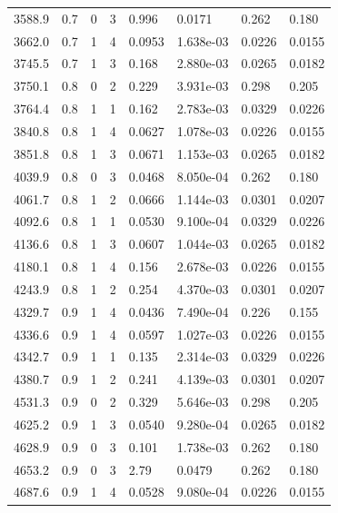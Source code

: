 \documentclass[preview]{standalone}
\begin{document}
{{{\begin{tabular}{L{1.2cm}C{1.2cm} C{0.3cm}C{0.5cm} C{1.4cm}C{1.4cm} C{1.4cm}C{1.4cm}}
  3588.9  &   0.7  & 0     &  3 &  0.996  & 0.0171  & 0.262 &  0.180   \\ 
  3662.0  &   0.7  & 1     &  4 &  0.0953  & 1.638e-03  & 0.0226 &  0.0155   \\ 
  3745.5  &   0.7  & 1     &  3 &  0.168  & 2.880e-03  & 0.0265 &  0.0182   \\ 
  3750.1  &   0.8  & 0     &  2 &  0.229  & 3.931e-03  & 0.298 &  0.205   \\ 
  3764.4  &   0.8  & 1     &  1 &  0.162  & 2.783e-03  & 0.0329 &  0.0226   \\ 
  3840.8  &   0.8  & 1     &  4 &  0.0627  & 1.078e-03  & 0.0226 &  0.0155   \\ 
  3851.8  &   0.8  & 1     &  3 &  0.0671  & 1.153e-03  & 0.0265 &  0.0182   \\ 
  4039.9  &   0.8  & 0     &  3 &  0.0468  & 8.050e-04  & 0.262 &  0.180   \\ 
  4061.7  &   0.8  & 1     &  2 &  0.0666  & 1.144e-03  & 0.0301 &  0.0207   \\ 
  4092.6  &   0.8  & 1     &  1 &  0.0530  & 9.100e-04  & 0.0329 &  0.0226   \\ 
  4136.6  &   0.8  & 1     &  3 &  0.0607  & 1.044e-03  & 0.0265 &  0.0182   \\ 
  4180.1  &   0.8  & 1     &  4 &  0.156  & 2.678e-03  & 0.0226 &  0.0155   \\ 
  4243.9  &   0.8  & 1     &  2 &  0.254  & 4.370e-03  & 0.0301 &  0.0207   \\ 
  4329.7  &   0.9  & 1     &  4 &  0.0436  & 7.490e-04  & 0.226 &  0.155   \\ 
  4336.6  &   0.9  & 1     &  4 &  0.0597  & 1.027e-03  & 0.0226 &  0.0155   \\ 
  4342.7  &   0.9  & 1     &  1 &  0.135  & 2.314e-03  & 0.0329 &  0.0226   \\ 
  4380.7  &   0.9  & 1     &  2 &  0.241  & 4.139e-03  & 0.0301 &  0.0207   \\ 
  4531.3  &   0.9  & 0     &  2 &  0.329  & 5.646e-03  & 0.298 &  0.205   \\ 
  4625.2  &   0.9  & 1     &  3 &  0.0540  & 9.280e-04  & 0.0265 &  0.0182   \\ 
  4628.9  &   0.9  & 0     &  3 &  0.101  & 1.738e-03  & 0.262 &  0.180   \\ 
  4653.2  &   0.9  & 0     &  3 &  2.79  & 0.0479  & 0.262 &  0.180   \\ 
  4687.6  &   0.9  & 1     &  4 &  0.0528  & 9.080e-04  & 0.0226 &  0.0155   \\ 

\end{tabular}}}}
\end{document}
